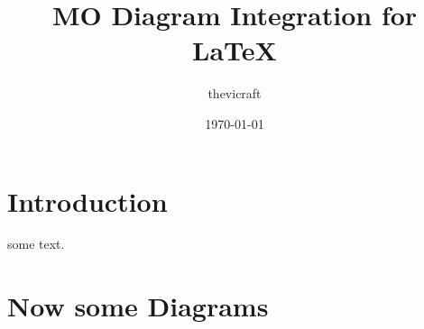 \documentclass[12pt, a4paper]{article}
\title{MO Diagram Integration for LaTeX}
\author{thevicraft}
\date{\today}
\begin{document}
\maketitle

\newpage
\listoffigures
\newpage

\section{Introduction}
some text.

\section{Now some Diagrams}











\end{document}
